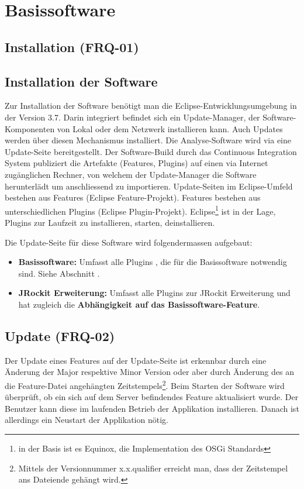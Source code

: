 \section{Basissoftware}
\subsection{Installation (FRQ-01)}
\subsection{Installation der Software}\label{installation}
Zur Installation der Software benötigt man die Eclipse-Entwicklungsumgebung in der Version 3.7. Darin integriert befindet sich ein Update-Manager, der Software-Komponenten von Lokal oder dem Netzwerk installieren kann. Auch Updates werden über diesen Mechanismus installiert. Die Analyse-Software wird via eine Update-Seite bereitgestellt. Der Software-Build durch das Continuous Integration System publiziert die Artefakte (Features, Plugins) auf einen via Internet zugänglichen Rechner, von welchem der Update-Manager die Software herunterlädt um anschliessend zu importieren. Update-Seiten im Eclipse-Umfeld bestehen aus Features (Eclipse Feature-Projekt). Features bestehen aus unterschiedlichen Plugins (Eclipse Plugin-Projekt). Eclipse\footnote{in der Basis ist es Equinox, die Implementation des OSGi Standards} ist in der Lage, Plugins zur Laufzeit zu installieren, starten, deinstallieren.

Die Update-Seite für diese Software wird folgendermassen aufgebaut:
\begin{itemize}
\item \textbf{Basissoftware:} Umfasst alle Plugins , die für die Basissoftware notwendig sind. Siehe Abschnitt .
\item \textbf{JRockit Erweiterung: }Umfasst alle Plugins zur JRockit Erweiterung und hat zugleich die \textbf{Abhängigkeit auf das Basissoftware-Feature}.
\end{itemize}

\subsection{Update (FRQ-02)}
Der Update eines Features auf der Update-Seite ist erkennbar durch eine Änderung der Major respektive Minor Version oder aber durch Änderung des an die Feature-Datei angehängten Zeitstempels\footnote{Mittels der Versionnummer x.x.qualifier erreicht man, dass der Zeitstempel ans Dateiende gehängt wird.}. Beim Starten der Software wird überprüft, ob ein sich auf dem Server befindendes Feature aktualisiert wurde. Der Benutzer kann diese im laufenden Betrieb der Applikation installieren. Danach ist allerdings ein Neustart der Applikation nötig. 


